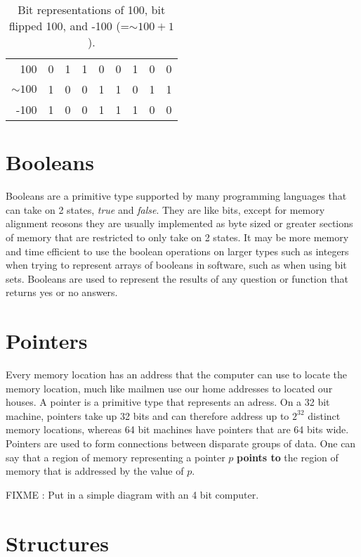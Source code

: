 \documentclass[12pt, letterpaper]{book}
\begin{document}
\begin{table}[h]
\centering
\begin{tabular}{r|l|l|l|l|l|l|l|l|}
\cline{2-9}
100 & 0 & 1 & 1 & 0 & 0 & 1 & 0 & 0 \\ \cline{2-9} 
$\sim 100$ & 1 & 0 & 0 & 1 & 1 & 0 & 1& 1 \\ \cline{2-9} 
-100 & 1 & 0 & 0 & 1 & 1 & 1 & 0 & 0 \\ \cline{2-9} 
\end{tabular}
\caption{Bit representations of 100, bit flipped 100, and -100 (=$\sim 100 + 1$).}
\label{figure:2scomplement}
\end{table}

	\section{Booleans}

	Booleans are a primitive type supported by many programming languages that can take on 2 states, \textit{true} and \textit{false}. They are like bits, except for memory alignment reosons they are usually implemented as byte sized or greater sections of memory that are restricted to only take on 2 states. It may be more memory and time efficient to use the boolean operations on larger types such as integers when trying to represent arrays of booleans in software, such as when using bit sets. Booleans are used to represent the results of any question or function that returns yes or no answers.

	\section{Pointers}

	Every memory location has an address that the computer can use to locate the memory location, much like mailmen use our home addresses to located our houses. A pointer is a primitive type that represents an adress. On a 32 bit machine, pointers take up 32 bits and can therefore address up to $2^{32}$ distinct memory locations, whereas 64 bit machines have pointers that are 64 bits wide. Pointers are used to form connections between disparate groups of data. One can say that a region of memory representing a pointer $p$ \textbf{points to} the region of memory that is addressed by the value of $p$.

FIXME : Put in a simple diagram with an 4 bit computer.

	\section{Structures}
\end{document}
